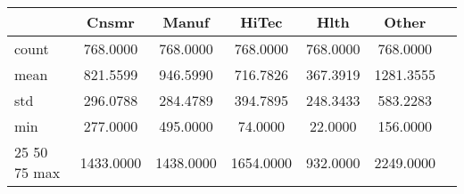 \begin{tabular}{lcccccc}
\toprule
 & Cnsmr & Manuf & HiTec & Hlth  & Other \\
\midrule
count & 768.0000 & 768.0000 & 768.0000 & 768.0000 & 768.0000 \\
mean & 821.5599 & 946.5990 & 716.7826 & 367.3919 & 1281.3555 \\
std & 296.0788 & 284.4789 & 394.7895 & 248.3433 & 583.2283 \\
min & 277.0000 & 495.0000 & 74.0000 & 22.0000 & 156.0000 \\
25%
50%
75%
max & 1433.0000 & 1438.0000 & 1654.0000 & 932.0000 & 2249.0000 \\
\bottomrule
\end{tabular}
